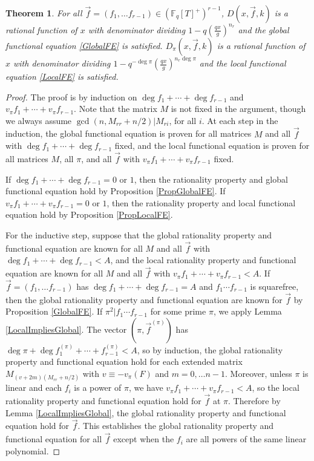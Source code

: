 \documentclass[11pt,letterpaper]{article}
\newtheorem{theorem}{Theorem}[section]
\theoremstyle{definition}
\theoremstyle{remark}
\numberwithin{equation}{section}
\theoremstyle{dotless}
\newcommand{\F}{\mathbb{F}}
\begin{document}
\begin{theorem} \label{TheoremFE}
For all $\vec{f}=(f_1, \ldots f_{r-1}) \in (\F_q[T]^+)^{r-1}$, $D(x, \vec{f}, k)$ is a rational function of $x$ with denominator dividing $1-q\left(\frac{q x}{g}\right)^{n_r}$ and the global functional equation \eqref{GlobalFE} is satisfied. $D_{\pi}(x, \vec{f}, k)$ is a rational function of $x$ with denominator dividing $1-q^{-\deg \pi} \left( \frac{qx}{g}\right)^{n_r \deg \pi}$ and the local functional equation \eqref{LocalFE} is satisfied.
\end{theorem}

\begin{proof}
The proof is by induction on $\deg f_1 + \cdots + \deg f_{r-1}$ and $v_{\pi} f_1+\cdots+v_{\pi} f_{r-1}$. Note that the matrix $M$ is not fixed in the argument, though we always assume $\gcd(n, M_{rr}+n/2) | M_{ri}$, for all $i$. At each step in the induction, the global functional equation is proven for all matrices $M$ and all $\vec{f}$ with $\deg f_1 + \cdots + \deg f_{r-1}$ fixed, and the local functional equation is proven for all matrices $M$, all $\pi$, and all $\vec{f}$ with $v_{\pi} f_1+\cdots+v_{\pi} f_{r-1}$ fixed.

If $\deg f_1 + \cdots + \deg f_{r-1} =0$ or $1$, then the rationality property and global functional equation hold by Proposition \ref{PropGlobalFE}. If $v_\pi f_1 + \cdots + v_\pi f_{r-1} =0$ or $1$, then the rationality property and local functional equation hold by Proposition \ref{PropLocalFE}. 

For the inductive step, suppose that the global rationality property and functional equation are known for all $M$ and all $\vec{f}$ with $\deg f_1 + \cdots + \deg f_{r-1} < A$, and the local rationality property and functional equation are known for all $M$ and all $\vec{f}$ with $v_\pi f_1 + \cdots + v_\pi f_{r-1} < A$. If $\vec{f}=(f_1,\ldots f_{r-1})$ has $\deg f_1 + \cdots + \deg f_{r-1} = A$ and $f_1\cdots f_{r-1}$ is squarefree, then the global rationality property and functional equation are known for $\vec{f}$ by Proposition \ref{GlobalFE}. If $\pi^2 | f_1\cdots f_{r-1}$ for some prime $\pi$, we apply Lemma \ref{LocalImpliesGlobal}. The vector $(\pi, \vec{f}^{(\pi)})$ has $\deg \pi + \deg f_1^{(\pi)} + \cdots + f_{r-1}^{(\pi)}< A$, so by induction, the global rationality property and functional equation hold for each extended matrix $M_{(v+2m)(M_{rr}+n/2)}$ with $v \equiv -v_{\pi}(F)$ and $m=0, \ldots n-1$. Moreover, unless $\pi$ is linear and each $f_i$ is a power of $\pi$, we have $v_\pi f_1+\cdots + v_\pi f_{r-1} < A$, so the local rationality property and functional equation hold for $\vec{f}$ at $\pi$. Therefore by Lemma \ref{LocalImpliesGlobal}, the global rationality property and functional equation hold for $\vec{f}$. This establishes the global rationality property and functional equation for all $\vec{f}$ except when the $f_i$ are all powers of the same linear polynomial.  


\end{proof}
\end{document}
